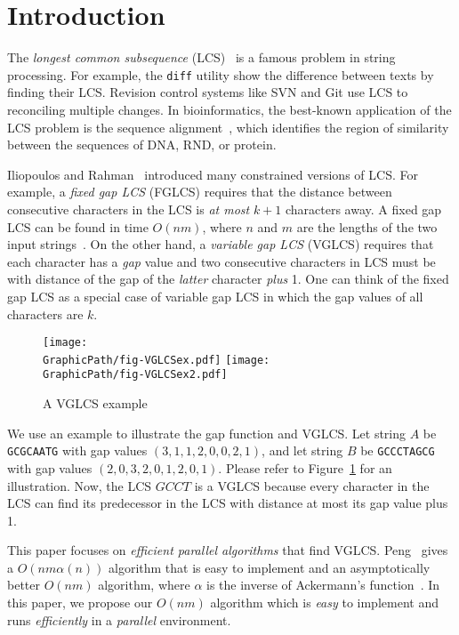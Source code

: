 \section{Introduction} %
\label{sec:Introduction}

The {\em longest common subsequence} (LCS)~\cite{Hirschberg1975ALS} is a
famous problem in string processing.  For example, the {\tt diff}
utility show the difference between texts by finding their LCS. Revision
control systems like SVN and Git use LCS to reconciling multiple
changes.  In bioinformatics, the best-known application of the LCS
problem is the sequence alignment~\cite{mount2001bioinformatics,
Ann2010EfficientAF}, which identifies the region of similarity between
the sequences of DNA, RND, or protein.

Iliopoulos and Rahman~\cite{Rahman2006AlgorithmsFC} introduced many
constrained versions of LCS.  For example, a {\em fixed gap LCS} (FGLCS)
requires that the distance between consecutive characters in the LCS is
{\em at most} $k + 1$ characters away.  A fixed gap LCS can be found in
time $O(nm)$, where $n$ and $m$ are the lengths of the two input
strings~\cite{Rahman2006AlgorithmsFC}.  On the other hand, a {\em
variable gap LCS} (VGLCS) requires that each character has a {\em gap}
value and two consecutive characters in LCS must be with distance of the
gap of the {\em latter} character {\em plus} 1.  One can think of the
fixed gap LCS as a special case of variable gap LCS in which the gap
values of all characters are $k$.

\begin{figure}[!thb]
  \centering
  \texttt{[image: \\GraphicPath/fig-VGLCSex.pdf]}
  \texttt{[image: \\GraphicPath/fig-VGLCSex2.pdf]}
  \caption{A VGLCS example} \label{fig:VGLCSex}
\end{figure}

We use an example to illustrate the gap function and VGLCS.  Let string
$A$ be {\tt GCGCAATG} with gap values $(3, 1, 1, 2, 0, 0, 2, 1)$, and
let string $B$ be {\tt GCCCTAGCG} with gap values $(2, 0, 3, 2, 0, 1, 2,
0, 1)$.  Please refer to Figure~\ref{fig:VGLCSex} for an illustration.
Now, the LCS $GCCT$ is a VGLCS because every character in the LCS can
find its predecessor in the LCS with distance at most its gap value plus
1.

This paper focuses on {\em efficient parallel algorithms} that find
VGLCS.  Peng~\cite{Peng2011TheLC} gives a $O(nm \alpha(n))$ algorithm
that is easy to implement and an asymptotically better $O(nm)$
algorithm, where $\alpha$ is the inverse of Ackermann's
function~\cite{Banachowski1980ACT}.  In this paper, we propose our
$O(nm)$ algorithm which is {\em easy} to implement and runs {\em
efficiently} in a {\em parallel} environment.

